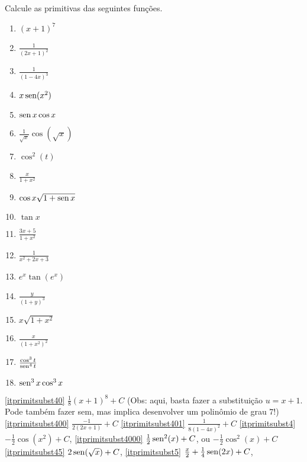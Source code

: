\begin{exo}
Calcule as primitivas das seguintes funções.
\begin{multicols}{3}
\begin{enumerate}
\item\label{itprimitsubst40} $(x+1)^7$
\item\label{itprimitsubst400} $\frac{1}{(2x+1)^2}$
\item\label{itprimitsubst401} $\frac{1}{(1-4x)^3}$
\item\label{itprimitsubst4} $x\operatorname{sen}(x^2)$
\item \label{itprimitsubst4000} $\operatorname{sen} x \cos x$
\item\label{itprimitsubst45} $\tfrac{1}{\sqrt{x}}\cos (\sqrt{x})$
\item\label{itprimitsubst5} $\cos^2(t)$
\item\label{itprimitsubst7} $\frac{x}{1+x^2}$
\item\label{itprimitsubst71} $\cos x\sqrt{1+\operatorname{sen} x}$
\item\label{itprimitsubst8} $\tan x$
\item\label{itprimitsubst9} $\frac{3x+5}{1+x^2}$
\item\label{itprimitsubst10} $\frac{1}{x^2+2x+3}$
\item\label{itprimitsubst12} $e^x\tan(e^x)$
\item\label{itprimitsubst13} $\frac{y}{(1+y)^3}$
\item\label{itprimitsubst14} $x\sqrt{1+x^2}$
\item\label{itprimitsubst15} $\frac{x}{(1+x^2)^2}$
\item\label{itprimitsubst11} $\frac{\cos^3t}{\operatorname{sen}^4t}$
\item\label{itprimitsubst16} $\operatorname{sen}^3x\cos^3x$
\end{enumerate}
\end{multicols}
\vspace{0.01cm}
\begin{sol}
\eqref{itprimitsubst40} $\frac{1}{8}(x+1)^8+C$ (Obs: aqui, basta fazer a
substituição $u=x+1$. Pode também fazer sem, mas implica desenvolver um
polinômio de grau $7$!)
\eqref{itprimitsubst400} $\frac{-1}{2(2x+1)}+C$
\eqref{itprimitsubst401} $\frac{1}{8(1-4x)^2}+C$
\eqref{itprimitsubst4} $-\frac{1}{2}\cos(x^2)+C$,
\eqref{itprimitsubst4000} $\frac{1}{2}\operatorname{sen}^2(x)+C$, ou $-\frac{1}{2}\cos^2(x)+C$
\eqref{itprimitsubst45} $2\operatorname{sen}(\sqrt{x})+C$,
\eqref{itprimitsubst5} $\frac{x}{2}+\tfrac14\operatorname{sen} (2x)+C$,

\end{sol}
\end{exo}
